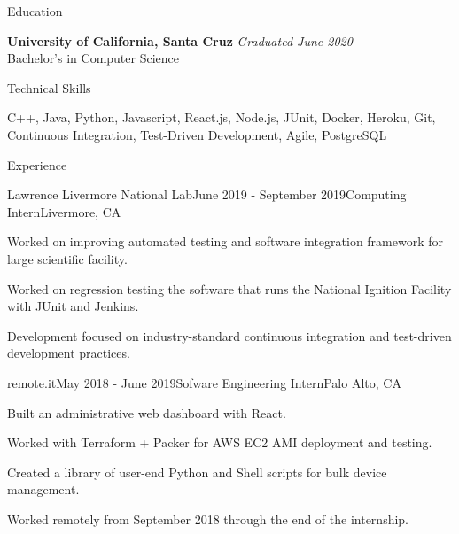 \documentclass{resume} %
\begin{document}

\begin{rSection}{Education}

    {\bf University of California, Santa Cruz} \hfill {\em Graduated June 2020} \\ 
    Bachelor's in Computer Science

\end{rSection}


\begin{rSection}{Technical Skills}
    \item C++, Java, Python, Javascript, React.js, Node.js, JUnit, Docker, Heroku, Git, Continuous Integration, 
    Test-Driven Development, Agile, PostgreSQL
\end{rSection}


\begin{rSection}{Experience}
    \begin{rSubsection}{Lawrence Livermore National Lab}{June 2019 - September 2019}{Computing Intern}{Livermore, CA}
        \item Worked on improving automated testing and software integration framework for large scientific facility.
        \item Worked on regression testing the software that runs the National Ignition Facility with JUnit and Jenkins.
        \item Development focused on industry-standard continuous integration and test-driven development practices.
    \end{rSubsection}

    \begin{rSubsection}{remote.it}{May 2018 - June 2019}{Sofware Engineering Intern}{Palo Alto, CA}
        \item Built an administrative web dashboard with React.
        \item Worked with Terraform + Packer for AWS EC2 AMI deployment and testing.
        \item Created a library of user-end Python and Shell scripts for bulk device management.
        \item Worked remotely from September 2018 through the end of the internship.
    \end{rSubsection}

\end{rSection}
\end{document}

